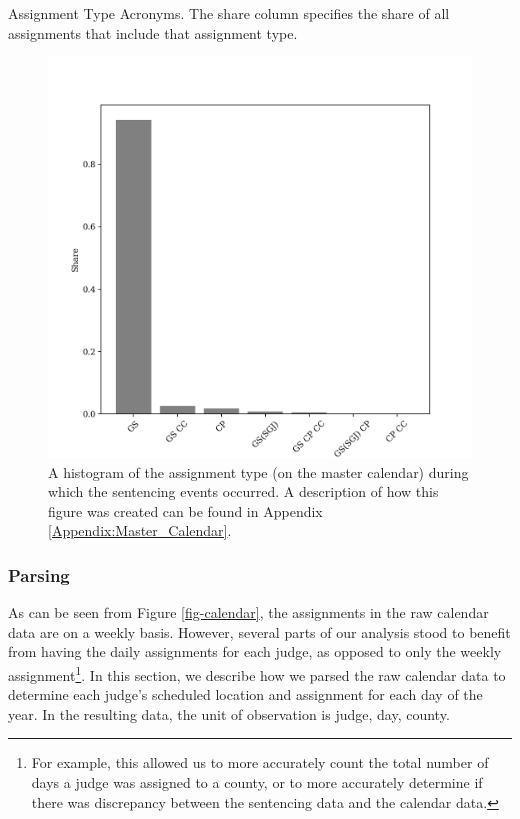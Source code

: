 \documentclass[11pt, oneside]{article}   	%
\theoremstyle{ModifiedStyle}
\begin{document}
      \begin{table}[H]
        \centering
        \caption{Assignment Type Acronyms. The share column specifies the share of all assignments that include that assignment type.}
        \label{tab-assignment-types}
        
      \end{table}

			\begin{figure}[H]
				\centering
				\includegraphics[scale=0.65]{../../output/figures/Description/sentencing_work_type_hist}
				\caption{A histogram of the assignment type (on the master calendar) during which the sentencing events occurred. A description of how this figure was created can be found in Appendix \ref{Appendix:Master_Calendar}.}
				\label{Figure_Assignment_Type_Sentencing_Event_Histogram}
			\end{figure}


    \subsubsection{Parsing}
      As can be seen from Figure \ref{fig-calendar}, the assignments in the raw calendar data are on a weekly basis. However, several parts of our analysis stood to benefit from having the daily assignments for each judge, as opposed to only the weekly assignment\footnote{For example, this allowed us to more accurately count the total number of days a judge was assigned to a county, or to more accurately determine if there was discrepancy between the sentencing data and the calendar data.}. In this section, we describe how we parsed the raw calendar data to determine each judge's scheduled location and assignment for each day of the year. In the resulting data, the unit of observation is judge, day, county.
\end{document}
